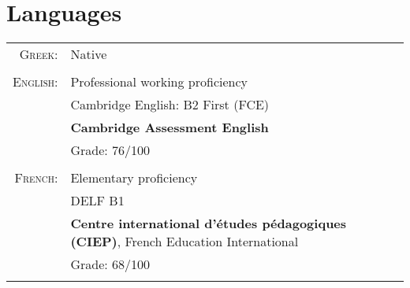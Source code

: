 \documentclass[a4paper,10pt]{article}
\begin{document}
\section{Languages}
\begin{tabular}{rl}
 \textsc{Greek:}&Native\\ \\
\textsc{English:}&Professional working proficiency \\& Cambridge English: B2 First (FCE) \\& \textbf{Cambridge Assessment English} \\& Grade: 76/100 \\ \\
\textsc{French:}&Elementary proficiency \\& DELF B1 \\& \textbf{Centre international d'études pédagogiques (CIEP)}, French Education International \\& Grade: 68/100 \\  \\
\end{tabular}
\end{document}
